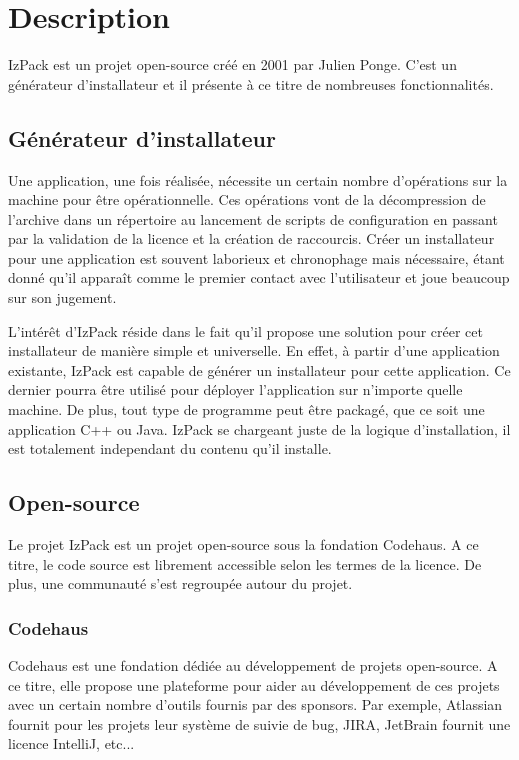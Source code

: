 \section{Description}
IzPack est un projet open-source créé en 2001 par Julien Ponge.
C'est un générateur d'installateur et il présente à ce titre de nombreuses fonctionnalités.
\subsection{Générateur d'installateur}
Une application, une fois réalisée, nécessite un certain nombre d'opérations sur la machine pour être opérationnelle.
Ces opérations vont de la décompression de l'archive dans un répertoire au lancement de scripts de configuration en passant par la validation de la licence et la création de raccourcis.
Créer un installateur pour une application est souvent laborieux et chronophage mais nécessaire, étant donné qu'il apparaît comme le premier contact avec l'utilisateur et joue beaucoup sur son jugement.

L'intérêt d'IzPack réside dans le fait qu'il propose une solution pour créer cet installateur de manière simple et universelle.
En effet, à partir d'une application existante, IzPack est capable de générer un installateur pour cette application.
Ce dernier pourra être utilisé pour déployer l'application sur n'importe quelle machine.
De plus, tout type de programme peut être packagé, que ce soit une application C++ ou Java.
IzPack se chargeant juste de la logique d'installation, il est totalement independant du contenu qu'il installe.

\subsection{Open-source}
Le projet IzPack est un projet open-source sous la fondation Codehaus.
A ce titre, le code source est librement accessible selon les termes de la licence. De plus, une communauté s'est regroupée autour du projet.

\subsubsection{Codehaus}
Codehaus est une fondation dédiée au développement de projets open-source.
A ce titre, elle propose une plateforme pour aider au développement de ces projets avec un certain nombre d'outils fournis par des sponsors.
Par exemple, Atlassian fournit pour les projets leur système de suivie de bug, JIRA, JetBrain fournit une licence IntelliJ, etc...

